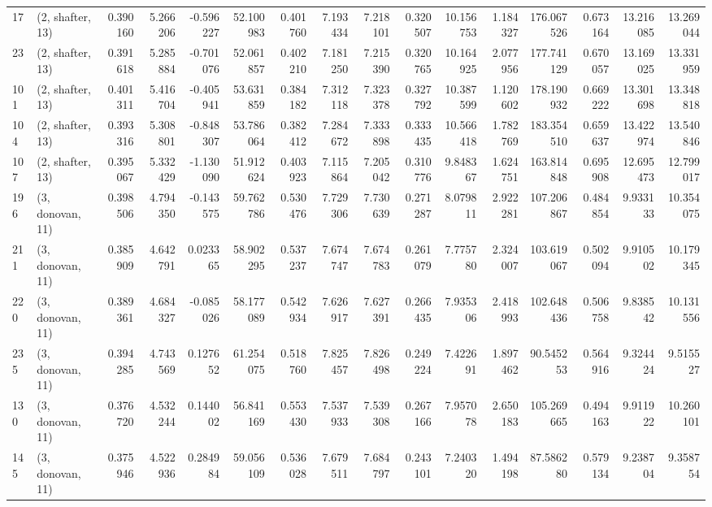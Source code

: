 \begin{tabular}{llrrrrrrrrrrrrrr}
17  &  (2, shafter, 13) &   0.390160 &   5.266206 & -0.596227 &   52.100983 &  0.401760 &   7.193434 &   7.218101 &  0.320507 &  10.156753 &   1.184327 &  176.067526 &  0.673164 &  13.216085 &  13.269044 \\
23  &  (2, shafter, 13) &   0.391618 &   5.285884 & -0.701076 &   52.061857 &  0.402210 &   7.181250 &   7.215390 &  0.320765 &  10.164925 &   2.077956 &  177.741129 &  0.670057 &  13.169025 &  13.331959 \\
101 &  (2, shafter, 13) &   0.401311 &   5.416704 & -0.405941 &   53.631859 &  0.384182 &   7.312118 &   7.323378 &  0.327792 &  10.387599 &   1.120602 &  178.190932 &  0.669222 &  13.301698 &  13.348818 \\
104 &  (2, shafter, 13) &   0.393316 &   5.308801 & -0.848307 &   53.786064 &  0.382412 &   7.284672 &   7.333898 &  0.333435 &  10.566418 &   1.782769 &  183.354510 &  0.659637 &  13.422974 &  13.540846 \\
107 &  (2, shafter, 13) &   0.395067 &   5.332429 & -1.130090 &   51.912624 &  0.403923 &   7.115864 &   7.205042 &  0.310776 &   9.848367 &   1.624751 &  163.814848 &  0.695908 &  12.695473 &  12.799017 \\
196 &  (3, donovan, 11) &   0.398506 &   4.794350 & -0.143575 &   59.762786 &  0.530476 &   7.729306 &   7.730639 &  0.271287 &   8.079811 &   2.922281 &  107.206867 &  0.484854 &   9.933133 &  10.354075 \\
211 &  (3, donovan, 11) &   0.385909 &   4.642791 &  0.023365 &   58.902295 &  0.537237 &   7.674747 &   7.674783 &  0.261079 &   7.775780 &   2.324007 &  103.619067 &  0.502094 &   9.910502 &  10.179345 \\
220 &  (3, donovan, 11) &   0.389361 &   4.684327 & -0.085026 &   58.177089 &  0.542934 &   7.626917 &   7.627391 &  0.266435 &   7.935306 &   2.418993 &  102.648436 &  0.506758 &   9.838542 &  10.131556 \\
235 &  (3, donovan, 11) &   0.394285 &   4.743569 &  0.127652 &   61.254075 &  0.518760 &   7.825457 &   7.826498 &  0.249224 &   7.422691 &   1.897462 &   90.545253 &  0.564916 &   9.324424 &   9.515527 \\
130 &  (3, donovan, 11) &   0.376720 &   4.532244 &  0.144002 &   56.841169 &  0.553430 &   7.537933 &   7.539308 &  0.267166 &   7.957078 &   2.650183 &  105.269665 &  0.494163 &   9.911922 &  10.260101 \\
145 &  (3, donovan, 11) &   0.375946 &   4.522936 &  0.284984 &   59.056109 &  0.536028 &   7.679511 &   7.684797 &  0.243101 &   7.240320 &   1.494198 &   87.586280 &  0.579134 &   9.238704 &   9.358754 \\

\end{tabular}
